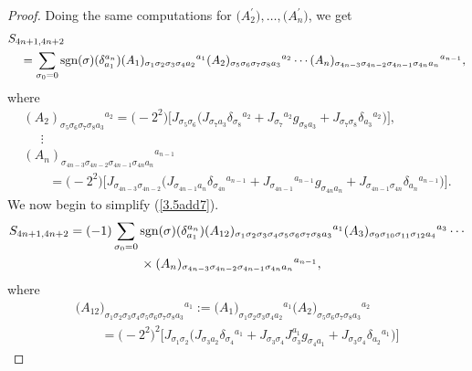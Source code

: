 \documentclass[pdftex]{sigma}
\numberwithin{equation}{section}
\theoremstyle{definition}
\newcommand{\sgn}{{\rm sgn}}
\begin{document}
\begin{proof}
Doing the same computations for $\bigl(A_2^\prime\bigr),\dots, \bigl(A_n^\prime \bigr)$, we get
\begin{align}\label{3.5add7}
&{S_{4n+1,4n+2}} \\
 &\quad{}= \sum_{\sigma_0 = 0} \sgn(\sigma) (\delta_{a_1}^{a_n})
 ({A_1})_{\sigma_1 \sigma_2 \sigma_3 \sigma_4 a_2}{}^{a_1}
 ({A_2})_{\sigma_5 \sigma_6 \sigma_7 \sigma_8 a_3}{}^{a_2} \cdots
({A_n})_{\sigma_{4n-3} \sigma_{4n-2} \sigma_{4n-1} \sigma_{4n} a_n}{}^{a_{n-1}}, \nonumber
\end{align}
where
\begin{gather*} %
({A_2})_{\sigma_5 \sigma_6 \sigma_7 \sigma_8 a_3}{}^{a_2}
=
\bigl(-2^2\bigr) \bigl[J_{\sigma_5 \sigma_6}
 \bigl(J_{\sigma_7 a_3} \delta_{\sigma_8}{}^{a_2}
 +J_{\sigma_7}{}^{a_2} g_{\sigma_8 a_3}
 + J_{\sigma_7 \sigma_8} \delta_{a_3}{}^{a_2} \bigr) \bigr],
\\ \nonumber
\quad \ \, \vdots \\ \nonumber
 ({A_n})_{\sigma_{4n-3} \sigma_{4n-2} \sigma_{4n-1} \sigma_{4n} a_n} {}^{a_{n-1}} \nonumber\\
\qquad{}= \bigl(-2^2\bigr)
 \bigl[J_{\sigma_{4n-3} \sigma_{4n-2}} \bigl(J_{\sigma_{4n-1} a_n} \delta_{\sigma_{4n}}{}^{a_{n-1}}
 +J_{\sigma_{4n-1}}{}^{a_{n-1}} g_{\sigma_{4n} a_n}
+ J_{\sigma_{4n-1} \sigma_{4n}} \delta_{a_n}{}^{a_{n-1}} \bigr) \bigr]. \nonumber
\end{gather*}
We now begin to simplify (\ref{3.5add7}).
\begin{align*}%
{S_{4n+1,4n+2}}
 = (-1) \sum_{\sigma_0 = 0}{}& \sgn(\sigma) (\delta_{a_1}^{a_n})
({A_{12}})_{\sigma_1 \sigma_2 \sigma_3 \sigma_4 \sigma_5 \sigma_6 \sigma_7 \sigma_8 a_3}{}^{a_1}
 ({A_3})_{\sigma_9 \sigma_{10} \sigma_{11} \sigma_{12} a_4}{}^{a_3}\cdots
\\ \nonumber
&
\times ({A_n})_{\sigma_{4n-3} \sigma_{4n-2} \sigma_{4n-1} \sigma_{4n} a_n}{}^{a_{n-1}},
\end{align*}
where
\begin{gather}
{\bigl({A_{12}}\bigr)_{\sigma_1 \sigma_2 \sigma_3 \sigma_4
\sigma_5 \sigma_6 \sigma_7 \sigma_8 a_3}{}^{a_1}
:= \bigl({A_1}\bigr)_{\sigma_1 \sigma_2 \sigma_3 \sigma_4 a_2}{}^{a_1}
 \bigl({A_2}\bigr)_{\sigma_5 \sigma_6 \sigma_7 \sigma_8 a_3}{}^{a_2} }\nonumber\\
\qquad{}=
\bigl(-2^2\bigr)^2 \bigl[
 J_{\sigma_1 \sigma_2 }
\bigl(J_{\sigma_3 a_2} \delta_{\sigma_4}{}^{a_1}
+ J_{\sigma_3 \sigma_4} J_{\sigma_3}^{a_1}g_{\sigma_4 a_1} +
J_{\sigma_3 \sigma_4} \delta_{a_2}{}^{a_1} \bigr)\bigr]

\end{gather}
\end{proof}
\end{document}
